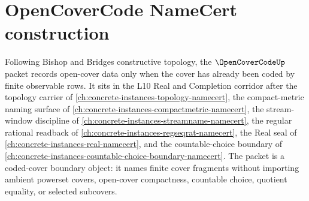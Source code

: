 \chapter{OpenCoverCode NameCert construction}
\label{ch:concrete-instances-open-cover-code-namecert}

Following Bishop and Bridges constructive topology, the $\OpenCoverCodeUp$ packet records open-cover data only when the cover has already been coded by finite observable rows. It sits in the L10 Real and Completion corridor after the topology carrier of \autoref{ch:concrete-instances-topology-namecert}, the compact-metric naming surface of \autoref{ch:concrete-instances-compactmetric-namecert}, the stream-window discipline of \autoref{ch:concrete-instances-streamname-namecert}, the regular rational readback of \autoref{ch:concrete-instances-regseqrat-namecert}, the Real seal of \autoref{ch:concrete-instances-real-namecert}, and the countable-choice boundary of \autoref{ch:concrete-instances-countable-choice-boundary-namecert}. The packet is a coded-cover boundary object: it names finite cover fragments without importing ambient powerset covers, open-cover compactness, countable choice, quotient equality, or selected subcovers.

